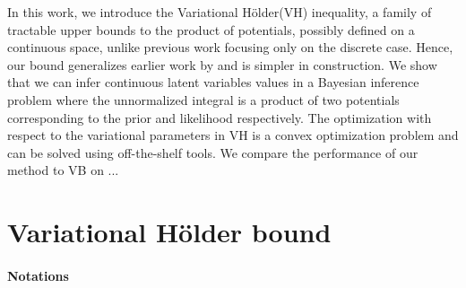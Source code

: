 \documentclass{article} %
\newcommand{\Holder}{H\"older\xspace}
\newcommand{\red}[1]{{\color{red}#1}}
\newcommand{\LSE}[3]{\bar{\mathbb{E}}_{#1}^{#2}\left[#3\right]}
\newcommand{\Expectation}[2]{\int{#2}d\nu(\Z)}
\def\Z{Z}
\begin{document}
In this work, we introduce the Variational \Holder (VH) inequality, a family of tractable upper bounds to the product
of potentials, possibly defined on a continuous space, unlike previous work focusing %
only on the discrete case. Hence, our bound generalizes earlier work by \citet{liu11d} and is simpler in construction.  
\red{We show that we can infer continuous latent variables values in a Bayesian inference problem where the unnormalized integral is a product of two potentials corresponding to the prior and likelihood respectively. The optimization with respect to the variational parameters in VH is a convex optimization problem and can be solved using off-the-shelf tools. We compare the performance of our method to VB on ...}


\citep{hoffman2014stochastic}
\citep{meltzer2009convergent}

\section{Variational \Holder bound}
\label{sec:vh}


\paragraph{Notations}
\end{document}
